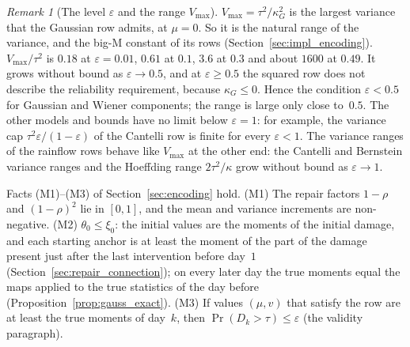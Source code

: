 \documentclass[11pt,a4paper]{article}
\theoremstyle{plain}
\theoremstyle{definition}
\theoremstyle{remark}
\newtheorem{remark}[theorem]{Remark}
\begin{document}
\begin{remark}[The level $\varepsilon$ and the range $V_{\max}$]\label{rem:vmax}
$V_{\max} = \tau^2/\kappa_G^2$ is the largest variance that the Gaussian row admits, at $\mu = 0$.
So it is the natural range of the variance, and the big-M constant of its rows (Section~\ref{sec:impl_encoding}).
$V_{\max}/\tau^2$ is $0.18$ at $\varepsilon = 0.01$, $0.61$ at $0.1$, $3.6$ at $0.3$ and about $1600$ at $0.49$.
It grows without bound as $\varepsilon \to 0.5$, and at $\varepsilon \ge 0.5$ the squared row does not describe the reliability requirement, because $\kappa_G \le 0$.
Hence the condition $\varepsilon < 0.5$ for Gaussian and Wiener components; the range is large only close to~$0.5$.
The other models and bounds have no limit below $\varepsilon = 1$: for example, the variance cap $\tau^2\varepsilon/(1-\varepsilon)$ of the Cantelli row is finite for every $\varepsilon < 1$.
The variance ranges of the rainflow rows behave like $V_{\max}$ at the other end: the Cantelli and Bernstein variance ranges and the Hoeffding range $2\tau^2/\kappa$ grow without bound as $\varepsilon \to 1$.
\end{remark}

Facts (M1)--(M3) of Section~\ref{sec:encoding} hold.
(M1) The repair factors $1-\rho$ and $(1-\rho)^2$ lie in $[0, 1]$, and the mean and variance increments are non-negative.
(M2) $\theta_0 \le \xi_0$: the initial values are the moments of the initial damage, and each starting anchor is at least the moment of the part of the damage present just after the last intervention before day~$1$ (Section~\ref{sec:repair_connection}); on every later day the true moments equal the maps applied to the true statistics of the day before (Proposition~\ref{prop:gauss_exact}).
(M3) If values $(\mu, v)$ that satisfy the row are at least the true moments of day~$k$, then $\Pr(D_k > \tau) \le \varepsilon$ (the validity paragraph).
\end{document}
